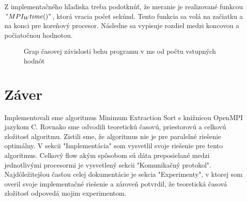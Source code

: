 \documentclass[12pt,a4paper,titlepage,final]{article}
\begin{document}
Z implementačného hľadiska treba podotknúť, že meranie je realizované funkcou $"MPI_Wtime()"$, ktorá vracia počet sekúnd. Tento funkcia sa volá na začiatku a na konci pre koreňový procesor. Následne sa vypisuje rozdiel medzi koncovou a počiatočnou hodnotou.
 \begin{figure}[h]

\begin{center}
\caption{Grap časovej závislosti behu programu v ms od počtu vstupných hodnôt}
\end{center}

\end{figure}





\section{Záver}
Implementovali sme algoritmus Minimum Extraction Sort s knižnicou OpenMPI jazykom C. Rovnako sme odvodili teoretickú časovú, priestorovú a celkovú zložitosť algoritmu. Zistili sme, že algoritmus nie je pre paralelné riešenie optimálny. V sekcii "Implementácia" som vysvetlil svoje riešenie pre tento algoritmus. Celkový flow akým spôsobom sú dáta preposielané medzi jednotlivými procesormi je vysvetlený sekcii "Komunikačný protokol". Najdôležitejšou časťou celej dokumentácie je sekcia "Experimenty", v ktorej som overil svoje implementačné riešenie a zároveň potvrdil, že teoretická časová zložitosť odpovedá mojim experimentom.
\end{document}

